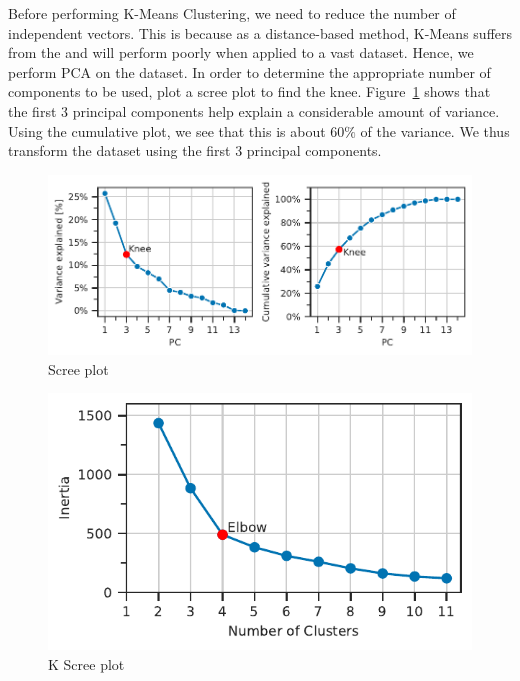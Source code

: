\documentclass[11pt,a4paper]{article}
\begin{document}
Before performing K-Means Clustering, we need to reduce the number of independent vectors. This is because as a distance-based method, K-Means suffers from the  and will perform poorly when applied to a vast dataset. Hence, we perform PCA on the dataset. In order to determine the appropriate number of components to be used, plot a scree plot to find the knee. Figure~\ref{fds-project-template:fig:scree_plot} shows that the first 3 principal components help explain a considerable amount of variance. Using the cumulative plot, we see that this is about $60\%$ of the variance. We thus transform the dataset using the first 3 principal components.
\begin{figure} [h!]
  \centering
  \includegraphics{report/scree_plot.pdf}
  \caption{Scree plot}
  \label{fds-project-template:fig:scree_plot}
\end{figure}
\begin{figure} [h!]
  \centering
  \includegraphics{report/k_screeplot.pdf}
  \caption{K Scree plot}
  \label{fds-project-template:fig:k_screeplot}
\end{figure} \\ \\
\end{document}
